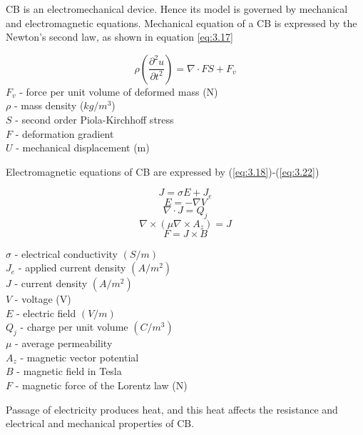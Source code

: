 CB is an electromechanical device. Hence its model is governed by mechanical and electromagnetic equations. Mechanical equation of a CB is expressed by the Newton's second law, as shown in equation \ref{eq:3.17}

\begin{equation}\label{eq:3.17}
\rho \left( \frac{\partial^2 u}{\partial t^2} \right) =  \nabla \cdot FS + F_v
\end{equation}
$F_v$ - force per unit volume of deformed mass (N)\\
$\rho$ - mass density ($kg/m^3$)\\ 
$S$ - second order Piola-Kirchhoff stress\\
$F$ - deformation gradient\\
$U$ - mechanical displacement (m) 

Electromagnetic equations of CB are expressed by (\ref{eq:3.18})-(\ref{eq:3.22})

\begin{equation}\label{eq:3.18}
J = \sigma E + J_e
\end{equation}
\begin{equation}
E = - \nabla V
\end{equation}
\begin{equation}
\nabla \cdot J = Q_j
\end{equation}
\begin{equation}
\nabla \times (\mu \nabla \times A_z) = J
\end{equation}
\begin{equation} \label{eq:3.22}
F = J \times B
\end{equation}

$\sigma$ - electrical conductivity $(S/m)$\\
$J_e$ - applied current density $(A/m^2)$\\ 
$J$ - current density $(A/m^2)$\\ 
$V$ - voltage (V) \\
$E$ - electric field $(V/m)$ \\
$Q_j$ - charge per unit volume $(C/m^3)$\\
$\mu$ - average permeability\\
$A_z$ - magnetic vector potential\\
$B$ - magnetic field in Tesla \\
$F$ - magnetic force of the Lorentz law (N)

Passage of electricity produces heat, and this heat affects the resistance and electrical and mechanical properties of CB. 

